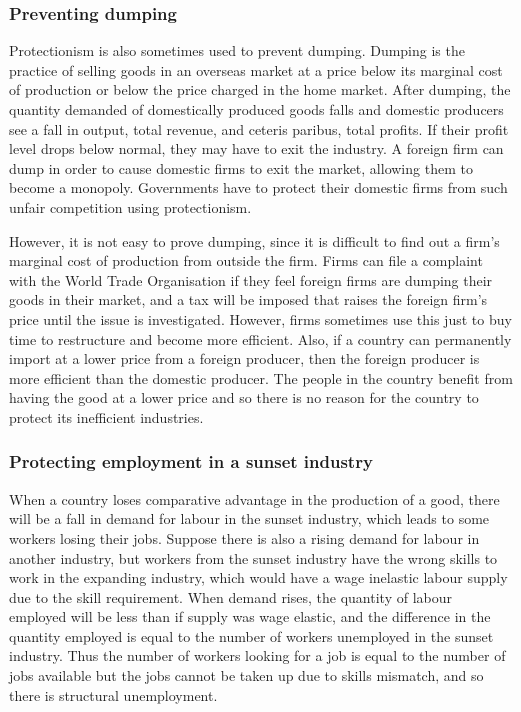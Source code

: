\documentclass[Economics.tex]{subfiles}
\begin{document}
\subsubsection{Preventing dumping}
Protectionism is also sometimes used to prevent dumping. Dumping is the practice of selling goods in an overseas market at a price below its marginal cost of production or below the price charged in the home market. After dumping, the quantity demanded of domestically produced goods falls and domestic producers see a fall in output, total revenue, and ceteris paribus, total profits. If their profit level drops below normal, they may have to exit the industry. A foreign firm can dump in order to cause domestic firms to exit the market, allowing them to become a monopoly. Governments have to protect their domestic firms from such unfair competition using protectionism.

However, it is not easy to prove dumping, since it is difficult to find out a firm's marginal cost of production from outside the firm. Firms can file a complaint with the World Trade Organisation if they feel foreign firms are dumping their goods in their market, and a tax will be imposed that raises the foreign firm's price until the issue is investigated. However, firms sometimes use this just to buy time to restructure and become more efficient. Also, if a country can permanently import at a lower price from a foreign producer, then the foreign producer is more efficient than the domestic producer. The people in the country benefit from having the good at a lower price and so there is no reason for the country to protect its inefficient industries.
\subsubsection{Protecting employment in a sunset industry}
When a country loses comparative advantage in the production of a good, there will be a fall in demand for labour in the sunset industry, which leads to some workers losing their jobs. Suppose there is also a rising demand for labour in another industry, but workers from the sunset industry have the wrong skills to work in the expanding industry, which would have a wage inelastic labour supply due to the skill requirement. When demand rises, the quantity of labour employed will be less than if supply was wage elastic, and the difference in the quantity employed is equal to the number of workers unemployed in the sunset industry. Thus the number of workers looking for a job is equal to the number of jobs available but the jobs cannot be taken up due to skills mismatch, and so there is structural unemployment.
\end{document}
